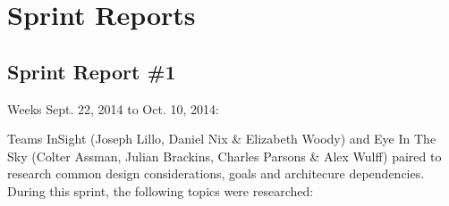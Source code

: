 
\chapter{Sprint Reports}

\section{Sprint Report \#1}

\let\stdsection\section
\renewcommand\section{\newpage\stdsection}

Weeks Sept. 22, 2014 to Oct. 10, 2014:

Teams InSight (Joseph Lillo, Daniel Nix \& Elizabeth Woody) and Eye In The Sky (Colter Assman, Julian Brackins, Charles Parsons \& Alex Wulff) paired to research common design considerations, goals and architecure dependencies.  During this sprint, the following topics were researched: 

